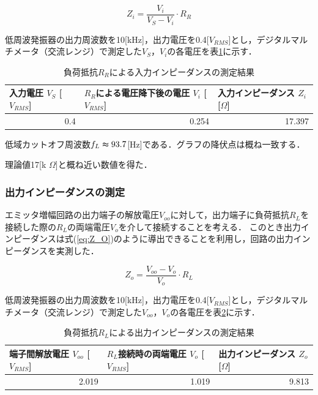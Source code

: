 \documentclass[dvipdfmx,titlepage,a4j]{jsarticle}  %
\numberwithin{equation}{section}
\begin{document}
\begin{equation}
  Z_i = \frac{V_i}{V_S - V_i} \cdot R_R
  \label{eq:Z_I}
\end{equation}

低周波発振器の出力周波数を10[kHz]，出力電圧を0.4[$V_{RMS}$]とし，デジタルマルチメータ（交流レンジ）で測定した$V_S$，$V_i$の各電圧を表\ref{tbl:res;Z_I}に示す．

\begin{table}[H]
  \caption{負荷抵抗$R_R$による入力インピーダンスの測定結果}
  \begin{center}
    \begin{tabular}{l|l|l}
      \hline
      入力電圧 $V_S$ [$V_{RMS}$] & $R_R$による電圧降下後の電圧 $V_i$ [$V_{RMS}$] & 入力インピーダンス $Z_i$ [$\Omega$] \\ \hline\hline
      \multicolumn{1}{r|}{0.4}   & \multicolumn{1}{r|}{0.254}                    & \multicolumn{1}{r}{17.397}          \\ \hline
    \end{tabular}
  \end{center}
  \label{tbl:res;Z_I}
\end{table}

低域カットオフ周波数$f_L \thickapprox 93.7$[Hz]である．グラフの降伏点は概ね一致する．

理論値17[k $\Omega$]と概ね近い数値を得た．

\subsubsection{出力インピーダンスの測定}
エミッタ増幅回路の出力端子の解放電圧$V_{oo}$に対して，出力端子に負荷抵抗$R_L$を接続した際の$R_L$の両端電圧$V_o$を介して接続することを考える．
このとき出力インピーダンスは式(\ref{eq:Z_O})のように導出できることを利用し，回路の出力インピーダンスを実測した．

\begin{equation}
  Z_o = \frac{V_{oo} - V_o}{V_o} \cdot R_L
  \label{eq:Z_O}
\end{equation}

低周波発振器の出力周波数を10[kHz]，出力電圧を0.4[$V_{RMS}$]とし，デジタルマルチメータ（交流レンジ）で測定した$V_{oo}$，$V_o$の各電圧を表\ref{tbl:res;Z_O}に示す．

\begin{table}[H]
  \caption{負荷抵抗$R_L$による出力インピーダンスの測定結果}
  \begin{center}
    \begin{tabular}{l|l|l}
      \hline
      端子間解放電圧 $V_{oo}$ [$V_{RMS}$] & $R_L$接続時の両端電圧 $V_o$ [$V_{RMS}$] & 出力インピーダンス $Z_o$ [$\Omega$] \\ \hline\hline
      \multicolumn{1}{r|}{2.019}          & \multicolumn{1}{r|}{1.019}              & \multicolumn{1}{r}{9.813}           \\ \hline
    \end{tabular}
  \end{center}
  \label{tbl:res;Z_O}
\end{table}
\end{document}
